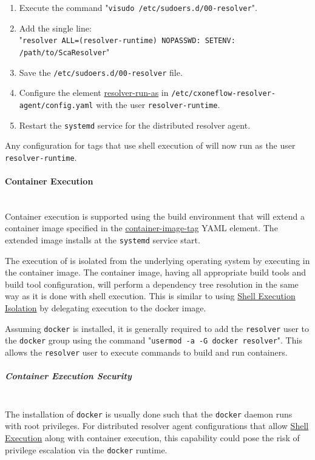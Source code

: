 \begin{enumerate}
  \item Execute the command "\texttt{visudo /etc/sudoers.d/00-resolver}".
  \item Add the single line:\\"\texttt{resolver ALL=(resolver-runtime) NOPASSWD: SETENV: /path/to/ScaResolver}"
  \item Save the \texttt{/etc/sudoers.d/00-resolver} file.
  \item Configure the element \hyperref[sec:agent-resolver-run-as]{resolver-run-as} in \texttt{/etc/cxoneflow-resolver-agent/config.yaml} 
  with the user \texttt{resolver-runtime}.
  \item Restart the \texttt{systemd} service for the distributed resolver agent.
\end{enumerate}

Any configuration for tags that use shell execution of \scaresolver will now run as the user \texttt{resolver-runtime}.

\paragraph{Container Execution}
\noindent\\Container execution is supported using the \toolkit build environment that will extend a container image
specified in the \hyperref[sec:agent-container-image-tag]{container-image-tag} YAML element.  The extended image
installs \scaresolver at the \texttt{systemd} service start.

The execution of \scaresolver is isolated from the underlying operating system by executing in the container image.
The container image, having all appropriate build tools and build tool configuration, will perform a dependency
tree resolution in the same way as it is done with shell execution.  This is similar to using
\hyperref[par:shell-agent-isolation]{Shell Execution Isolation} by delegating execution to the docker image.

Assuming \texttt{docker} is installed, it is generally required to add the \texttt{resolver} user to the \texttt{docker}
group using the command "\texttt{usermod -a -G docker resolver}".  This allows the \texttt{resolver} user to execute
commands to build and run containers.

\subparagraph{Container Execution Security}
\noindent\\The installation of \texttt{docker} is usually done such that the \texttt{docker} daemon runs with
root privileges.  For distributed resolver agent configurations that allow 
\hyperref[par:agent-shell-execution]{Shell Execution} along with container execution, this capability could pose
the risk of privilege escalation via the \texttt{docker} runtime.

